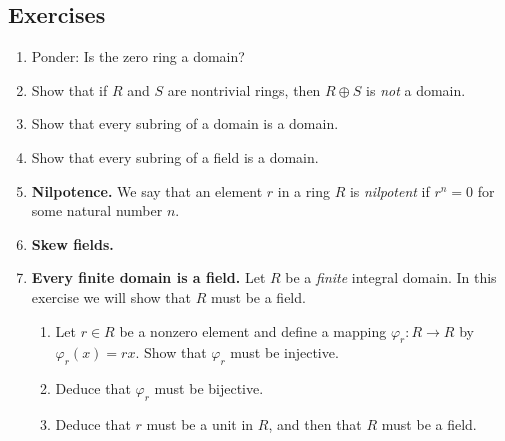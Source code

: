 \documentclass{article}
\begin{document}
\subsection*{Exercises}

\begin{enumerate}
\item Ponder: Is the zero ring a domain?

\item Show that if $R$ and $S$ are nontrivial rings, then $R \oplus S$ is \emph{not} a domain.

\item Show that every subring of a domain is a domain.

\item Show that every subring of a field is a domain.

\item \textbf{Nilpotence.} We say that an element $r$ in a ring $R$ is \emph{nilpotent} if $r^n = 0$ for some natural number $n$.

\item \textbf{Skew fields.}

\item \textbf{Every finite domain is a field.} Let $R$ be a \emph{finite} integral domain. In this exercise we will show that $R$ must be a field.
\begin{enumerate}
\item Let $r \in R$ be a nonzero element and define a mapping $\varphi_r : R \rightarrow R$ by $\varphi_r(x) = rx$. Show that $\varphi_r$ must be injective.
\item Deduce that $\varphi_r$ must be bijective.
\item Deduce that $r$ must be a unit in $R$, and then that $R$ must be a field.
\end{enumerate}
\end{enumerate}
\end{document}
